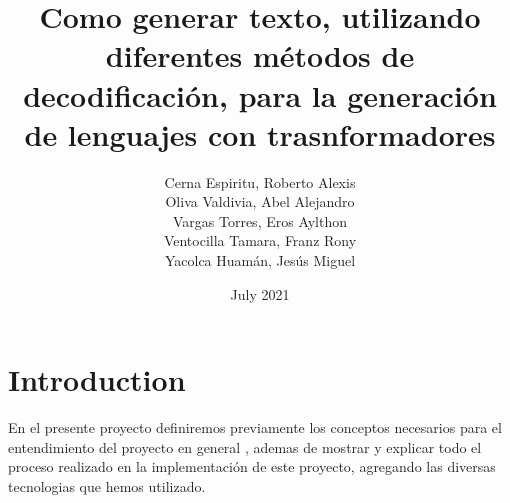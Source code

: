 \documentclass{article}
\title{Como generar texto, utilizando diferentes métodos de decodificación, para la generación de lenguajes con trasnformadores}
\author{Cerna Espiritu, Roberto Alexis \\ Oliva Valdivia, Abel Alejandro \\ Vargas Torres, Eros Aylthon \\ Ventocilla Tamara, Franz Rony \\ Yacolca Huamán, Jesús Miguel  }
\date{July 2021}
\begin{document}
\maketitle

\section{Introduction}
En el presente proyecto definiremos previamente los conceptos necesarios para el entendimiento del proyecto en general , ademas de mostrar y explicar todo el proceso realizado en la implementación de este proyecto, agregando las diversas tecnologias que hemos utilizado.
\end{document}
